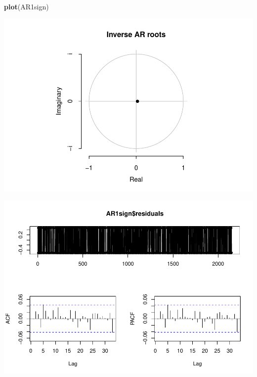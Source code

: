 \documentclass[11pt, a4paper]{report}
\newenvironment{Shaded}{\begin{snugshade}}{\end{snugshade}}
\newcommand{\KeywordTok}[1]{\textcolor[rgb]{0.13,0.29,0.53}{\textbf{#1}}}
\newcommand{\NormalTok}[1]{#1}
\newcommand{\OperatorTok}[1]{\textcolor[rgb]{0.81,0.36,0.00}{\textbf{#1}}}
\theoremstyle{plain}
\theoremstyle{plain}
\theoremstyle{remark}
\begin{document}
\begin{Shaded}
\begin{Highlighting}[]
\KeywordTok{plot}\NormalTok{(AR1sign)}
\end{Highlighting}
\end{Shaded}

\begin{center}\includegraphics{Econo2_P1_files/figure-latex/AR(1)-1} \end{center}

\begin{Shaded}
\end{Shaded}

\begin{center}\includegraphics{Econo2_P1_files/figure-latex/AR(1)-2} \end{center}
\end{document}
